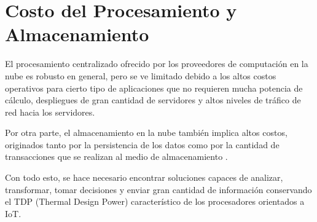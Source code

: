 
\section{Costo del Procesamiento y Almacenamiento}

El procesamiento centralizado ofrecido por los proveedores de computación en la nube es robusto en general, pero se ve limitado debido a los altos costos operativos para cierto tipo de  aplicaciones que no requieren mucha potencia de cálculo, despliegues de gran cantidad de servidores y altos niveles de tráfico de red hacia los servidores.

Por otra parte, el almacenamiento en la nube también implica altos costos, originados tanto por la persistencia de los datos como por la cantidad de transacciones que se realizan al medio de almacenamiento \citep{AzurePrice,AWSPrice,GCPrice,UPrice}.

Con todo esto, se hace necesario encontrar soluciones capaces de  analizar, transformar, tomar decisiones y enviar gran cantidad de información conservando el TDP (Thermal Design Power) característico de los procesadores orientados a IoT.
